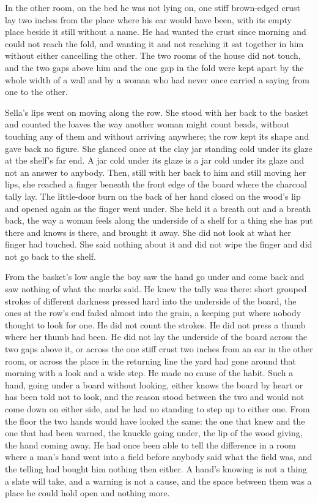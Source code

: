 In the other room, on the bed he was not lying on, one stiff brown-edged crust lay two inches from the place where his ear would have been, with its empty place beside it still without a name. He had wanted the crust since morning and could not reach the fold, and wanting it and not reaching it sat together in him without either cancelling the other. The two rooms of the house did not touch, and the two gaps above him and the one gap in the fold were kept apart by the whole width of a wall and by a woman who had never once carried a saying from one to the other.

Sella's lips went on moving along the row. She stood with her back to the basket and counted the loaves the way another woman might count beads, without touching any of them and without arriving anywhere; the row kept its shape and gave back no figure. She glanced once at the clay jar standing cold under its glaze at the shelf's far end. A jar cold under its glaze is a jar cold under its glaze and not an answer to anybody. Then, still with her back to him and still moving her lips, she reached a finger beneath the front edge of the board where the charcoal tally lay. The little-door burn on the back of her hand closed on the wood's lip and opened again as the finger went under. She held it a breath out and a breath back, the way a woman feels along the underside of a shelf for a thing she has put there and knows is there, and brought it away. She did not look at what her finger had touched. She said nothing about it and did not wipe the finger and did not go back to the shelf.

From the basket's low angle the boy saw the hand go under and come back and saw nothing of what the marks said. He knew the tally was there: short grouped strokes of different darkness pressed hard into the underside of the board, the ones at the row's end faded almost into the grain, a keeping put where nobody thought to look for one. He did not count the strokes. He did not press a thumb where her thumb had been. He did not lay the underside of the board across the two gaps above it, or across the one stiff crust two inches from an ear in the other room, or across the place in the returning line the yard had gone around that morning with a look and a wide step. He made no cause of the habit. Such a hand, going under a board without looking, either knows the board by heart or has been told not to look, and the reason stood between the two and would not come down on either side, and he had no standing to step up to either one. From the floor the two hands would have looked the same: the one that knew and the one that had been warned, the knuckle going under, the lip of the wood giving, the hand coming away. He had once been able to tell the difference in a room where a man's hand went into a field before anybody said what the field was, and the telling had bought him nothing then either. A hand's knowing is not a thing a slate will take, and a warning is not a cause, and the space between them was a place he could hold open and nothing more.

